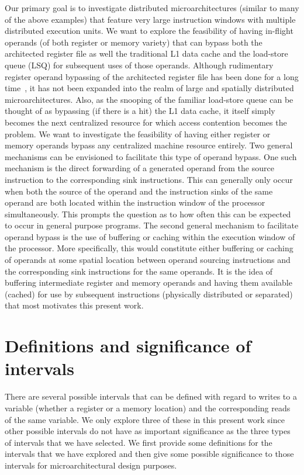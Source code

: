 \documentclass[10pt,dvips]{article}
\begin{document}
Our primary goal is to investigate distributed microarchitectures
(similar to many of the above examples) that feature very large
instruction windows with multiple distributed execution units.
We want to explore the feasibility of having in-flight operands
(of both register or memory variety) that can bypass both the
architected register file as well the traditional L1
data cache and the load-store queue (LSQ) for subsequent uses of
those operands.
Although rudimentary register operand bypassing of the architected register 
file has been done for a long time~\cite{Tom67},
it has not been expanded into the realm of large and spatially distributed
microarchitectures.
Also, as the snooping of the familiar load-store queue can be
thought of as bypassing (if there is a hit) the L1 data cache, it
itself simply becomes the next centralized resource for which
access contention becomes the problem.
We want to investigate the feasibility of having 
either register or memory operands bypass any centralized
machine resource entirely.  
Two general mechanisms can be envisioned to facilitate
this type of operand bypass.  
One such mechanism is the direct forwarding of a generated
operand from the source instruction to the corresponding sink
instructions.
This can generally only occur when
both the source of the operand and the instruction sinks of the same
operand are both located within the instruction window of the
processor simultaneously.  
This prompts the question as to how
often this can be expected to occur in general purpose programs.
The second general mechanism to facilitate operand
bypass is the use of buffering or caching within the execution
window of the processor.
More specifically, this would constitute either buffering or caching of
operands at some spatial location between operand sourcing instructions
and the corresponding sink instructions for the same operands.
It is the idea of buffering intermediate register and memory operands
and having them available (cached) for use by subsequent instructions
(physically distributed or separated)
that most motivates this present work.
%
%
\section{Definitions and significance of intervals}
%
There are several possible intervals that can be defined with
regard to writes to a variable (whether a register or a memory
location) and the corresponding reads of the same variable.
We only explore three of these in this present work since
other possible intervals do not have as important significance
as the three types of intervals that we have selected.
We first provide some definitions for the intervals that
we have explored and then give some possible significance
to those intervals for microarchitectural design purposes.
%
\end{document}
